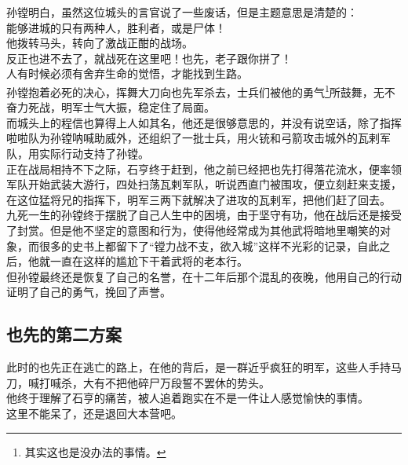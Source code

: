 \begin{multicols}{\theparacolNo}
孙镗明白，虽然这位城头的言官说了一些废话，但是主题意思是清楚的：\\

能够进城的只有两种人，胜利者，或是尸体！\\

他拨转马头，转向了激战正酣的战场。\\

反正也进不去了，就战死在这里吧！也先，老子跟你拼了！\\

人有时候必须有舍弃生命的觉悟，才能找到生路。\\

孙镗抱着必死的决心，挥舞大刀向也先军杀去，士兵们被他的勇气\footnote{其实这也是没办法的事情。}所鼓舞，无不奋力死战，明军士气大振，稳定住了局面。\\

而城头上的程信也算得上人如其名，他还是很够意思的，并没有说空话，除了指挥啦啦队为孙镗呐喊助威外，还组织了一批士兵，用火铳和弓箭攻击城外的瓦剌军队，用实际行动支持了孙镗。\\

正在战局相持不下之际，石亨终于赶到，他之前已经把也先打得落花流水，便率领军队开始武装大游行，四处扫荡瓦剌军队，听说西直门被围攻，便立刻赶来支援，在这位猛将兄的指挥下，明军三两下就解决了进攻的瓦剌军，把他们赶了回去。\\

九死一生的孙镗终于摆脱了自己人生中的困境，由于坚守有功，他在战后还是接受了封赏。但是他不坚定的意图和行为，使得他经常成为其他武将暗地里嘲笑的对象，而很多的史书上都留下了“镗力战不支，欲入城”这样不光彩的记录，自此之后，他就一直在这样的尴尬下干着武将的老本行。\\

但孙镗最终还是恢复了自己的名誉，在十二年后那个混乱的夜晚，他用自己的行动证明了自己的勇气，挽回了声誉。\\

\subsection{也先的第二方案}
此时的也先正在逃亡的路上，在他的背后，是一群近乎疯狂的明军，这些人手持马刀，喊打喊杀，大有不把他碎尸万段誓不罢休的势头。\\

他终于理解了石亨的痛苦，被人追着跑实在不是一件让人感觉愉快的事情。\\

这里不能呆了，还是退回大本营吧。\\


\end{multicols}
